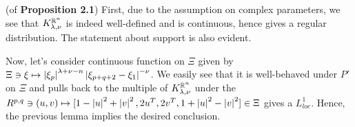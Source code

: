 \documentclass[10pt]{article} %
\theoremstyle{definition}
\theoremstyle{remark}
\begin{document}
\begin{myproof}(of {\bf Proposition 2.1})\newline
	First, due to the assumption on complex parameters, we see that $K_{ \lambda,\nu }^{ \mathbb{R}^n }$ is indeed well-defined and
	is continuous, hence gives a regular distribution. The statement about support is also evident.\par
	Now, let's consider continuous function on $\Xi$ given by
	$\Xi\ni\xi\mapsto\left|\xi_p\right|^{\lambda+\nu-n}\left|\xi_{p+q+2}-\xi_1\right|^{-\nu}$. We easily see that 
	it is well-behaved under $P'$ on $\Xi$ and pulls back to the multiple of $K_{ \lambda,\nu }^{ \mathbb{R}^n }$
	under the $R^{p,q}\ni(u,v)\mapsto
	[1-\left| u \right|^2+\left| v \right|^2,2u^T,2v^T,1+\left| u \right|^2-\left| v \right|^2]\in\Xi$ gives a $L^1_{loc}$. Hence, the previous
	lemma implies the desired conclusion.
\end{myproof}
\end{document}
